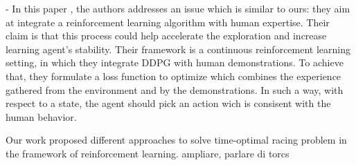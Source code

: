 - In this paper \cite{cinesi}, the authors addresses an issue which is similar to ours: they aim at integrate a reinforcement learning algorithm with human expertise. Their claim is that this process could help accelerate the exploration and increase learning agent's stability.
Their framework is a continuous reinforcement learning setting, in which they integrate DDPG with human demonstrations.
To achieve that, they formulate a loss function to optimize which combines the experience gathered from the environment and by the demonstrations. In such a way, with respect to a state, the agent should pick an action wich is consisent with the human behavior.

 Our work proposed different approaches to solve time-optimal racing problem in the framework of reinforcement learning. ampliare, parlare di torcs